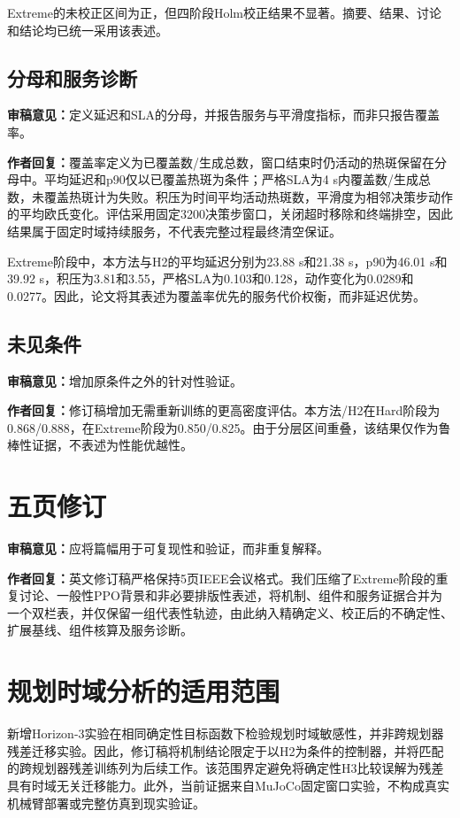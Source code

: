 \documentclass[UTF8,fontset=none]{ctexart}
\newcommand{\reviewcomment}[1]{\par\noindent\textbf{审稿意见：}#1\par}
\newcommand{\authorresponse}[1]{\par\noindent\textbf{作者回复：}#1\par}
\begin{document}
Extreme的未校正区间为正，但四阶段Holm校正结果不显著。摘要、结果、讨论和结论均已统一采用该表述。

\subsection{分母和服务诊断}
\reviewcomment{定义延迟和SLA的分母，并报告服务与平滑度指标，而非只报告覆盖率。}

\authorresponse{覆盖率定义为已覆盖数/生成总数，窗口结束时仍活动的热斑保留在分母中。平均延迟和p90仅以已覆盖热斑为条件；严格SLA为4 s内覆盖数/生成总数，未覆盖热斑计为失败。积压为时间平均活动热斑数，平滑度为相邻决策步动作的平均欧氏变化。评估采用固定3200决策步窗口，关闭超时移除和终端排空，因此结果属于固定时域持续服务，不代表完整过程最终清空保证。}

Extreme阶段中，本方法与H2的平均延迟分别为23.88 s和21.38 s，p90为46.01 s和39.92 s，积压为3.81和3.55，严格SLA为0.103和0.128，动作变化为0.0289和0.0277。因此，论文将其表述为覆盖率优先的服务代价权衡，而非延迟优势。

\subsection{未见条件}
\reviewcomment{增加原条件之外的针对性验证。}

\authorresponse{修订稿增加无需重新训练的更高密度评估。本方法/H2在Hard阶段为0.868/0.888，在Extreme阶段为0.850/0.825。由于分层区间重叠，该结果仅作为鲁棒性证据，不表述为性能优越性。}

\section{五页修订}
\reviewcomment{应将篇幅用于可复现性和验证，而非重复解释。}

\authorresponse{英文修订稿严格保持5页IEEE会议格式。我们压缩了Extreme阶段的重复讨论、一般性PPO背景和非必要排版性表述，将机制、组件和服务证据合并为一个双栏表，并仅保留一组代表性轨迹，由此纳入精确定义、校正后的不确定性、扩展基线、组件核算及服务诊断。}

\section{规划时域分析的适用范围}
新增Horizon-3实验在相同确定性目标函数下检验规划时域敏感性，并非跨规划器残差迁移实验。因此，修订稿将机制结论限定于以H2为条件的控制器，并将匹配的跨规划器残差训练列为后续工作。该范围界定避免将确定性H3比较误解为残差具有时域无关迁移能力。此外，当前证据来自MuJoCo固定窗口实验，不构成真实机械臂部署或完整仿真到现实验证。
\end{document}
